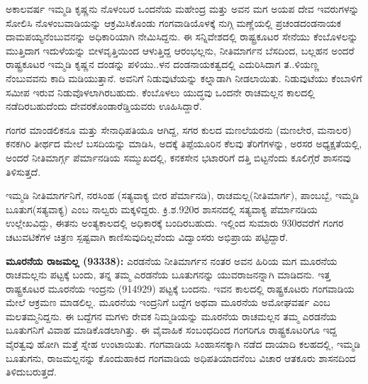 ಅಕಾಲವರ್ಷ ಇಮ್ಮಡಿ ಕೃಷ್ಣನು ನೊಳಂಬರ ಒಂದನೆಯ ಮಹೇಂದ್ರ ಮತ್ತು ಅವನ ಮಗ ಅಯಪ ದೇವ ಇವರುಗಳನ್ನು ಸೋಲಿಸಿ ನೊಳಂಬವಾಡಿಯನ್ನು ಆಕ್ರಮಿಸಿಕೊಂಡು ಗಂಗವಾಡಿಯೊಳಕ್ಕೆ ನುಗ್ಗಿ ಮಣ್ಣೆಯಲ್ಲಿ ಪ್ರಚಂಡ\break ದಂಡನಾಯಕ ದಾಮಪಯ್ಯನೆಂಬುವನನ್ನು ಅಧಿಕಾರಿಯಾಗಿ ನೇಮಿಸಿದ್ದನು. ಈ ಸನ್ನಿವೇಶದಲ್ಲಿ ರಾಷ್ಟ್ರಕೂಟರ ಸೇನೆಯು ಕೆಂಬೊಳಲನ್ನು ಮುತ್ತಿದಾಗ ಇದುಳೆಯನ್ನು ಬೀಳವೃತ್ತಿಯಿಂದ ಆಳುತ್ತಿದ್ದ ಆರಂಭಲ್ಲನು, ನೀತಿಮಾರ್ಗನ ಬೆಸದಿಂದ, ಬಲ್ಲಹನ ಅಂದರೆ ರಾಷ್ಟ್ರಕೂಟರ ಇಮ್ಮಡಿ ಕೃಷ್ಣನ ದಂಡನ್ನು ಪಳಿಯು..ಳನ ದಂಡನಾಯಕತ್ವದಲ್ಲಿ ಎದುರಿಸಿದಾಗ ತ..ಳಿಯಣ್ಣ ನೆಂಬುವವನು ಕಾದಿ ಮಡಿಯುತ್ತಾನೆ. ಅವನಿಗೆ ನಿಡುವುಟೆಯನ್ನು ಕಲ್ನಾಡಾಗಿ ನೀಡಲಾಯಿತು. ನಿಡುವುಟೆಯು ಕೆಂಬಾಳಿಗೆ ಸಮೀಪ ಇರುವ ನಿಡುವೊಳಲಾಗಿರಬಹುದು. ಕೆಂಬೊಳಲು ಯುದ್ಧವು ಒಂದನೇ ರಾಚಮಲ್ಲನ ಕಾಲದಲ್ಲಿ ನಡೆದಿರಬಹುದೆಂದು ದೇವರಕೊಂಡಾರೆಡ್ಡಿಯವರು ಊಹಿಸಿದ್ದಾರೆ.

ಗಂಗರ ಮಾಂಡಲಿಕನೂ ಮತ್ತು ಸೇನಾಧಿಪತಿಯೂ ಆಗಿದ್ದ, ಸಗರ ಕುಲದ ಮಣಲೆಯರನು (ಮಣಲೇರ, ಮನಾಲರ) ಕನಕಗಿರಿ ತೀರ್ಥದ ಮೇಲೆ ಬಸದಿಯನ್ನು ಮಾಡಿಸಿ, ಅದಕ್ಕೆ ತಿಪ್ಪೆಯೂರಿನ ಕೆಲವು ತೆರಿಗೆಗಳನ್ನು, ಅರಸರ ಅಧ್ಯಕ್ಷತೆಯಲ್ಲಿ, ಅಂದರೆ ನೀತಿಮಾರ್ಗ್ಗ ಪೆರ್ಮಾನಡಿಯ ಸಮ್ಮುಖದಲ್ಲಿ, ಕನಕಸೇನ ಭಟಾರರಿಗೆ ದತ್ತಿ ಬಿಟ್ಟನೆಂದು ಕೂಲಿಗ್ಗೆರೆ ಶಾಸನವು ತಿಳಿಸುತ್ತದೆ.

ಇಮ್ಮಡಿ ನೀತಿಮಾರ್ಗನಿಗೆ, ನರಸಿಂಹ (ಸತ್ಯವಾಕ್ಯ ಬೀರ ಪೆರ್ಮಾನಡಿ), ರಾಚಮಲ್ಲ(ನೀತಿಮಾರ್ಗ), ಪಾಂಬಬ್ಬೆ, ಇಮ್ಮಡಿ ಬೂತುಗ(ಸತ್ಯವಾಕ್ಯ) ಎಂಬ ನಾಲ್ವರು ಮಕ್ಕಳಿದ್ದರು. ಕ್ರಿ.ಶ.920ರ ಶಾಸನದಲ್ಲಿ ಸತ್ಯವಾಕ್ಯ ಪೆರ್ಮಾನಡಿಯ ಉಲ್ಲೇಖವಿದ್ದು, ಈತನು ಅಂತ್ಯಕಾಲದಲ್ಲಿ ಅಧಿಕಾರಕ್ಕೆ ಬಂದಿರಬಹುದು. ಇಲ್ಲಿಂದ ಸುಮಾರು 930ರವರೆಗೆ ಗಂಗರ ಚಟುವಟಿಕೆಗಳ ಚಿತ್ರಣ ಸ್ಪಷ್ಟವಾಗಿ ಕಾಣಿಸುವುದಿಲ್ಲವೆಂದು ವಿದ್ವಾಂಸರು ಅಭಿಪ್ರಾಯ ಪಟ್ಟಿದ್ದಾರೆ.

\textbf{ ಮೂರನೆಯ ರಾಜಮಲ್ಲ (933\general{\enginline{-}}38):} ಎರಡನೆಯ ನೀತಿಮಾರ್ಗನ ನಂತರ ಅವನ ಹಿರಿಯ ಮಗ ಮೂರನೆಯ ರಾಚಮಲ್ಲನು ಪಟ್ಟಕ್ಕೆ ಬಂದು, ತನ್ನ ತಮ್ಮ ಎರಡನೆಯ ಬೂತುಗನನ್ನು ಯುವರಾಜನನ್ನಾಗಿ ಮಾಡಿದನು. ಇತ್ತ ರಾಷ್ಟ್ರಕೂಟರ ಮೂರನೆಯ ಇಂದ್ರನು (914\enginline{-}929) ಪಟ್ಟಕ್ಕೆ ಬಂದನು. ಇವನ ಕಾಲದಲ್ಲಿ ರಾಷ್ಟ್ರಕೂಟರು ಗಂಗವಾಡಿಯ ಮೇಲೆ ಆಕ್ರಮಣ ಮಾಡಲಿಲ್ಲ. ಮೂರನೆಯ ಇಂದ್ರನಿಗೆ ಬದ್ದೆಗ ಅಥವಾ ಮೂರನೆಯ ಅಮೋಘವರ್ಷ ಎಂಬ ಮಲತಮ್ಮನಿದ್ದನು. ಈ ಬದ್ದೆಗನ ಮಗಳು ರೇವಕ ನಿಮ್ಮಡಿಯನ್ನು ಮೂರನೆಯ ರಾಚಮಲ್ಲನ ತಮ್ಮ ಎರಡನೆಯ ಬೂತುಗನಿಗೆ ವಿವಾಹ ಮಾಡಿಕೊಡಲಾಗಿತ್ತು. ಈ ವೈವಾಹಿಕ ಸಂಬಂಧದಿಂದ ಗಂಗರಿಗೂ ರಾಷ್ಟ್ರಕೂಟರಿಗೂ ಇದ್ದ ವೈರತ್ವವು ಹೋಗಿ ಮತ್ತೆ ಸ್ನೇಹ ಉಂಟಾಯಿತು. ಗಂಗವಾಡಿಯ ಸಿಂಹಾಸನಕ್ಕಾಗಿ ನಡೆದ ದಾಯಾದಿ ಕಲಹದಲ್ಲಿ, ಇಮ್ಮಡಿ ಬೂತುಗನು, ರಾಜಮಲ್ಲನನ್ನು ಕೊಂದುಹಾಕಿದ ಗಂಗವಾಡಿಯ ಅಧಿಪತಿಯಾದನೆಂಬ ವಿಚಾರ ಆತಕೂರು ಶಾಸನದಿಂದ ತಿಳಿದುಬರುತ್ತದೆ.

